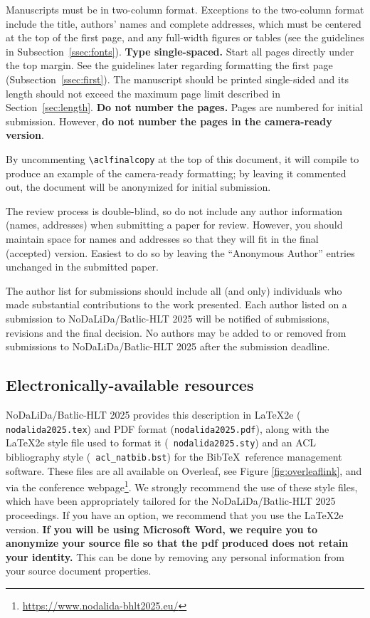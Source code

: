 \documentclass[11pt]{article}
\begin{document}
Manuscripts must be in two-column format.  Exceptions to the
two-column format include the title, authors' names and complete
addresses, which must be centered at the top of the first page, and
any full-width figures or tables (see the guidelines in
Subsection~\ref{ssec:fonts}). {\bf Type single-spaced.}  Start all
pages directly under the top margin. See the guidelines later
regarding formatting the first page (Subsection~\ref{ssec:first}).
The manuscript should be printed single-sided and its length should
not exceed the maximum page limit described in
Section~\ref{sec:length}.  {\bf Do not number the pages.}
Pages are numbered for  initial submission. However, {\bf do not number the pages in the camera-ready version}.

By uncommenting {\small\verb|\aclfinalcopy|} at the top of this 
 document, it will compile to produce an example of the camera-ready formatting; by leaving it commented out, the document will be anonymized for initial submission.  

The review process is double-blind, so do not include any author information (names, addresses) when submitting a paper for review.  
However, you should maintain space for names and addresses so that they will fit in the final (accepted) version. Easiest to do so by leaving the ``Anonymous Author'' entries unchanged in the submitted paper.

The author list for submissions should include all (and only) individuals who made substantial contributions to the work presented. Each author listed on a submission to NoDaLiDa/Batlic-HLT 2025 will be notified of submissions, revisions and the final decision. No authors may be added to or removed from submissions to NoDaLiDa/Batlic-HLT 2025 after the submission deadline.

\subsection{Electronically-available resources}

NoDaLiDa/Batlic-HLT 2025 provides this description in \LaTeX2e ({\small {\tt
    nodalida2025.tex}}) and PDF format ({\small {\tt nodalida2025.pdf}}),
along with the \LaTeX2e style file used to format it ({\small {\tt
    nodalida2025.sty}}) and an ACL bibliography style ({\small {\tt
    acl\_natbib.bst}}) for the Bib\TeX\ reference management
software. These files are all available on Overleaf, see Figure \ref{fig:overleaflink}, and via the conference webpage\footnote{\url{https://www.nodalida-bhlt2025.eu/}}.
 We strongly
recommend the use of these style files, which have been appropriately
tailored for the NoDaLiDa/Batlic-HLT 2025 proceedings. If you have an option, we
recommend that you use the \LaTeX2e version. \textbf{If you will be
  using Microsoft Word, we require you to anonymize
  your source file so that the pdf produced does not retain your
  identity.}  This can be done by removing any personal information
from your source document properties.
\end{document}
